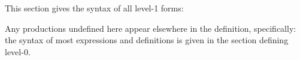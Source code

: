 \label{object-1-syntax-summary}
\begin{optDefinition}
\raggedbottom
%
This section gives the syntax of all level-1 forms:


Any productions undefined here appear elsewhere in the definition, specifically:
the syntax of most expressions and definitions is given in the section defining
level-0.

%

%

%
%
\flushbottom
%
\end{optDefinition}

